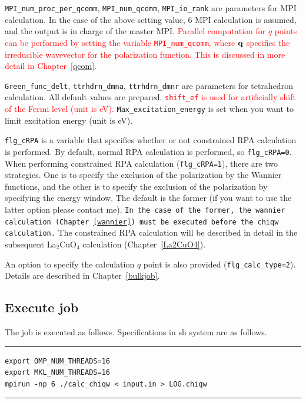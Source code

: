 \documentclass{article}
\newcommand{\tr}[1]{\textcolor{red}{#1}}
\begin{document}
\verb+MPI_num_proc_per_qcomm+, \verb+MPI_num_qcomm+, \verb+MPI_io_rank+ are parameters for MPI calculation. In the case of the above setting value, 6 MPI calculation is assumed, and the output is in charge of the master MPI. 
\tr{Parallel computation for $q$ points can be performed by setting the variable {\tt MPI\_num\_qcomm}, where ${\bf q}$ specifies the irreducible wavevector for the polarization function. This is discussed in more detail in Chapter~\ref{qcom}.} 

\verb+Green_func_delt+, \verb+ttrhdrn_dmna+, \verb+ttrhdrn_dmnr+ are parameters for tetrahedron calculation. All default values are prepared. \tr{{\tt shift\_ef} is used for artificially shift of the Fermi level (unit is eV).} \verb+Max_excitation_energy+ is set when you want to limit excitation energy (unit is eV).

\verb+flg_cRPA+ is a variable that specifies whether or not constrained RPA calculation is performed. By default, normal RPA calculation is performed, so \verb+flg_cRPA=0+. When performing constrained RPA calculation (\verb+flg_cRPA=1+), there are two strategies. One is to specify the exclusion of the polarization by the Wannier functions, and the other is to specify the exclusion of the polarization by specifying the energy window. The default is the former (if you want to use the latter option please contact me). {\tt In the case of the former, the {\tt wannier} calculation (Chapter~\ref{wannier}) must be executed before the {\tt chiqw} calculation.} The constrained RPA calculation will be described in detail in the subsequent La$_2$CuO$_4$ calculation (Chapter~\ref{La2CuO4}).

An option to specify the calculation $q$ point is also provided (\verb+flg_calc_type=2+). Details are described in Chapter~\ref{bulkjob}.


\subsection{\label{job-chiqw}Execute job}
The job is executed as follows. Specifications in sh system are as follows.
\vspace{3mm}\hrule
\begin{verbatim}
export OMP_NUM_THREADS=16
export MKL_NUM_THREADS=16
mpirun -np 6 ./calc_chiqw < input.in > LOG.chiqw  
\end{verbatim}
\hrule\vspace{3mm}
\end{document}
